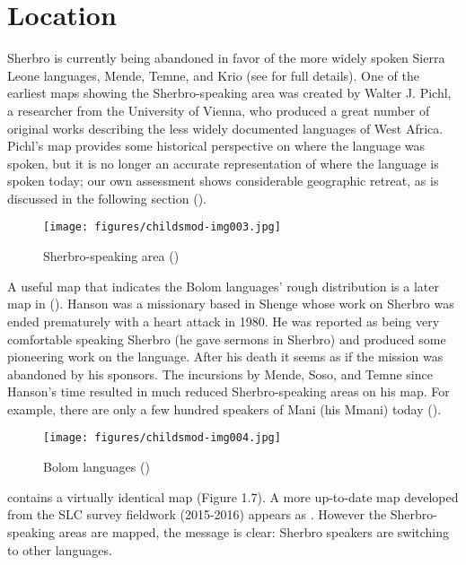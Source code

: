 \section{Location} 
\label{sec:1.6}\hypertarget{Toc115517748}{}
Sherbro is currently being abandoned in favor of the more widely spoken Sierra Leone languages, Mende, Temne, and Krio (see  for full details). One of the earliest maps showing the Sherbro-speaking area was created by Walter J. Pichl, a researcher from the University of Vienna, who produced a great number of original works describing the less widely documented languages of West Africa. Pichl's map provides some historical perspective on where the language was spoken, but it is no longer an accurate representation of where the language is spoken today; our own assessment shows considerable geographic retreat, as is discussed in the following section ().

\begin{figure}
\caption{Sherbro-speaking area (\citealt{Pichl1967})}
\label{fig:intro:3}
\label{map:1.3}
\texttt{[image: figures/childsmod-img003.jpg]}
\end{figure}

A useful map that indicates the Bolom languages' rough distribution is a later map in \citet{Hanson1979b} (). Hanson was a missionary based in Shenge whose work on Sherbro was ended prematurely with a heart attack in 1980. He was reported as being very comfortable speaking Sherbro (he gave sermons in Sherbro) and produced some pioneering work on the language. After his death it seems as if the mission was abandoned by his sponsors. The incursions by Mende, Soso, and Temne since Hanson's time resulted in much reduced Sherbro-speaking areas on his map. For example, there are only a few hundred speakers of Mani (his Mmani) today (\citealt{Childs2011}).

\begin{figure}
\caption{Bolom languages (\citealt{Hanson1979b})}
\label{fig:intro:4}
\label{map:1.4}
\texttt{[image: figures/childsmod-img004.jpg]}
\end{figure}

\citet{IversonCameron1986} contains a virtually identical map (Figure 1.7). A more up-to-date map developed from the SLC survey fieldwork (2015-2016) appears as . However the Sherbro-speaking areas are mapped, the message is clear: Sherbro speakers are switching to other languages.

